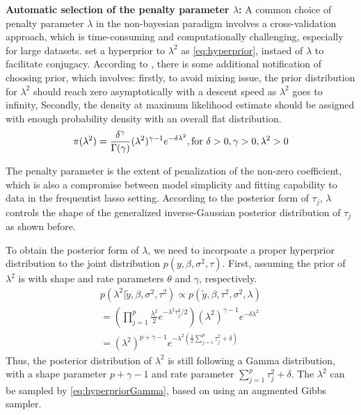 \textbf{Automatic selection of the penalty parameter $\lambda$:}
A common choice of penalty parameter $\lambda$ in the non-bayesian paradigm involves a cross-validation approach, which is time-consuming and computationally challenging, especially for large datasets.
\cite{park_casella_2008} set a hyperprior to $\lambda^2$ as \autoref{eq:hyperprior}, instaed of $\lambda$ to facilitate conjugacy.
According to \cite{park_casella_2008}, there is some additional notification of choosing prior, which involves: firstly, to avoid mixing issue, the prior distribution for $\lambda^2$ should reach zero asymptotically with a descent speed as $\lambda^2 $ goes to infinity, Secondly, the density at maximum likelihood estimate should be assigned with enough probability density with an overall flat distribution.
\begin{equation}
	\label{eq:hyperprior}
	\pi(\lambda^2) = \frac{\delta^\gamma}{\Gamma(\gamma)}(\lambda^2)^{\gamma-1}e^{-\delta\lambda^2}, \textnormal{for } \delta>0, \gamma>0, \lambda^2>0
\end{equation}

The penalty parameter is the extent of penalization of the non-zero coefficient, which is also a compromise between model simplicity and fitting capability to data in the frequentist lasso setting. According to the posterior form of $\tau_j$, $\lambda$ controls the shape of the generalized inverse-Gaussian posterior distribution of $\tau_j$ as shown before.

To obtain the posterior form of $\lambda$, we need to incorpoate a proper hyperprior distribution to the joint distribution $p(y,\beta,\sigma^2,\tau)$. First, assuming the prior of $\lambda^2$ is with shape and rate parameters $\theta$ and $\gamma$, respectively.
\begin{equation}
	\label{eq:hyperpriorGamma}
	\begin{multlined}
		p(\lambda^2|\tilde{y},\beta,\sigma^2,\tau^2) \propto  	p(\tilde{y},\beta,\tau^2,\sigma^2,\lambda)  \\
		= (\prod_{j=1}^p \frac{\lambda^2}{2} e^{-\lambda^2\tau_j^2/2})(\lambda^2)^{\gamma-1}e^{-\delta\lambda^2}\\
		= (\lambda^2)^{p+\gamma-1}e^{-\lambda^2(\frac{1}{2}\sum_{j=1}^p \tau_j^2+\delta)}
	\end{multlined}
\end{equation} 
Thus, the posterior distribution of $\lambda^2$ is still following a Gamma distribution, with a shape parameter $p+\gamma-1$ and rate parameter $\sum_{j=1}^p \tau_j^2+\delta$. The $\lambda^2$ can be sampled by \autoref{eq:hyperpriorGamma}, based on using an augmented Gibbs sampler.


